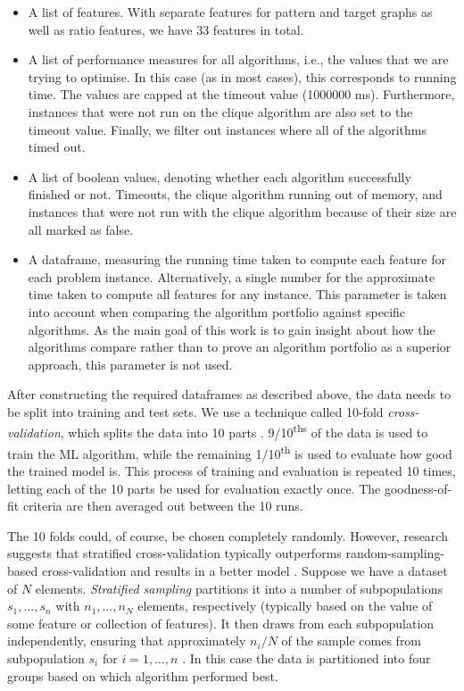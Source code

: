 \documentclass{l4proj}
\theoremstyle{definition}
\theoremstyle{remark}
\begin{document}
\begin{itemize}
\item A list of features. With separate features for pattern and target graphs
  as well as ratio features, we have 33 features in total.
\item A list of performance measures for all algorithms, i.e., the values that
  we are trying to optimise. In this case (as in most cases), this corresponds
  to running time. The values are capped at the timeout value (\num{1000000} ms).
  Furthermore, instances that were not run on the clique algorithm are also set
  to the timeout value. Finally, we filter out instances where all of the
  algorithms timed out.
\item A list of boolean values, denoting whether each algorithm successfully
  finished or not. Timeouts, the clique algorithm running out of memory, and
  instances that were not run with the clique algorithm because of their size
  are all marked as false.
\item A dataframe, measuring the running time taken to compute each feature for
  each problem instance. Alternatively, a single number for the approximate time
  taken to compute all features for any instance. This parameter is taken into
  account when comparing the algorithm portfolio against specific algorithms. As
  the main goal of this work is to gain insight about how the algorithms compare
  rather than to prove an algorithm portfolio as a superior approach, this
  parameter is not used.
\end{itemize}

After constructing the required dataframes as described above, the data needs to
be split into training and test sets. We use a technique called 10-fold
\emph{cross-validation}, which splits the data into 10 parts \cite{citeulike:1304145}.
9/10\textsuperscript{ths} of the data is used to train the ML algorithm, while
the remaining 1/10\textsuperscript{th} is used to evaluate how good the trained
model is. This process of training and evaluation is repeated 10 times, letting
each of the 10 parts be used for evaluation exactly once. The goodness-of-fit
criteria are then averaged out between the 10 runs.

The 10 folds could, of course, be chosen completely randomly. However, research
suggests that stratified cross-validation typically outperforms
random-sampling-based cross-validation and results in a better model
\cite{DBLP:conf/ijcai/Kohavi95}. Suppose we have a dataset of $N$ elements.
\emph{Stratified sampling} partitions it into a number of subpopulations $s_1,
\dots, s_n$ with $n_1, \dots, n_N$ elements, respectively (typically based on
the value of some feature or collection of features). It then draws from each
subpopulation independently, ensuring that approximately $n_i/N$ of the sample
comes from subpopulation $s_i$ for $i = 1, \dots, n$ \cite{lohr2009sampling}. In
this case the data is partitioned into four groups based on which algorithm
performed best.
\end{document}

